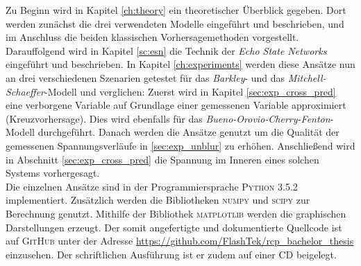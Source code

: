 Zu Beginn wird in Kapitel \ref{ch:theory} ein theoretischer Überblick gegeben. Dort werden zunächst die drei verwendeten Modelle eingeführt und beschrieben, und im Anschluss die beiden klassischen Vorhersagemethoden vorgestellt. Darauffolgend wird in Kapitel \ref{sc:esn} die Technik der \textit{Echo State Networks} eingeführt und beschrieben. In Kapitel \ref{ch:experiments} werden diese Ansätze nun an drei verschiedenen Szenarien getestet für das \textit{Barkley}- und das \textit{Mitchell-Schaeffer}-Modell und verglichen: Zuerst wird in Kapitel \ref{sec:exp_cross_pred} eine verborgene Variable auf Grundlage einer gemessenen Variable approximiert (Kreuzvorhersage). Dies wird ebenfalls für das \textit{Bueno-Orovio-Cherry-Fenton}-Modell durchgeführt. Danach werden die Ansätze genutzt um die Qualität der gemessenen Spannungsverläufe in \ref{sec:exp_unblur} zu erhöhen. Anschließend wird in Abschnitt \ref{sec:exp_cross_pred} die Spannung im Inneren eines solchen Systems vorhergesagt.\\

Die einzelnen Ansätze sind in der Programmiersprache \textsc{Python 3.5.2} implementiert. Zusätzlich werden die Bibliotheken \textsc{numpy} und \textsc{scipy} zur Berechnung genutzt. Mithilfe der Bibliothek \textsc{matplotlib} werden die graphischen Darstellungen erzeugt. Der somit angefertigte und dokumentierte Quellcode ist auf \textsc{GitHub} unter der Adresse \href{https://github.com/FlashTek/rcp\_bachelor\_thesis}{https://github.com/FlashTek/rcp\_bachelor\_thesis} einzusehen. Der schriftlichen Ausführung ist er zudem auf einer CD beigelegt.
